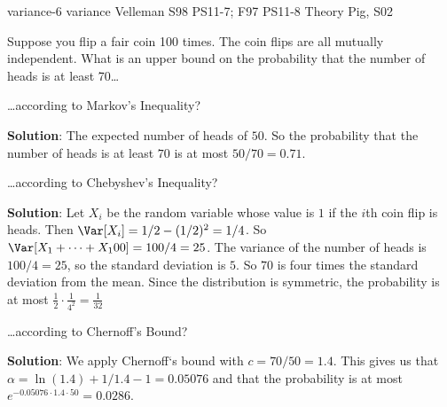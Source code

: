 \problemdata       %
        {variance-6}             %
        {variance}               %
        {Velleman}               %
        {S98 PS11-7; F97 PS11-8} %
        {Theory Pig, S02}        %
\begin{problem}

Suppose you flip a fair coin 100 times.  The coin flips are all mutually independent.  
What is an upper bound on the probability
that the number of heads is at least 70\ldots
\begin{problemparts}

\problempart
\ldots according to Markov's Inequality?

\textbf{Solution}:
The expected number of heads of $50$.  So the probability that the
number of heads is at least $70$ is at most $50/70 = 0.71$.

\problempart
\ldots according to Chebyshev's Inequality?

\textbf{Solution}:
Let $X_i$ be the random variable whose value is $1$ if the $i$th coin
flip is heads.  Then $\Var[X_i] =  1/2 - (1/2)^2 = 1/4$.  So $\Var[X_1
+ \cdots + X_100] = 100/4 = 25$.
 The variance of the number of heads is $100/4 = 25$, so the standard
deviation is $5$.  So $70$ is four times the standard deviation from
the mean.  Since the distribution is symmetric, the
probability is at most $\frac{1}{2} \cdot \frac{1}{4^2} = \frac{1}{32}$


\problempart
\ldots according to Chernoff's Bound?

\textbf{Solution}:
We apply Chernoff`s bound with $c = 70/50 = 1.4$.  This gives us that
$\alpha = \ln(1.4) + 1/1.4 - 1 = 0.05076$ and that the probability is at most $e^{-0.05076 \cdot 1.4 \cdot 50} = 0.0286$.


\end{problemparts}

\end{problem}

